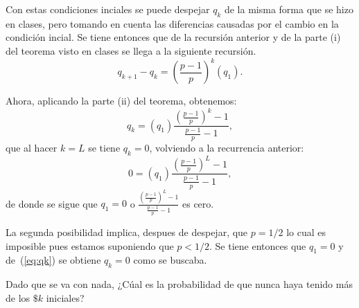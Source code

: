 \documentclass{scrartcl}
\begin{document}
Con estas condiciones inciales se puede despejar $q_k$ de la misma forma que
se hizo en clases, pero tomando en cuenta las diferencias causadas por el cambio
en la condición incial. Se tiene entonces que de la recursión anterior y de la parte (i)
del teorema visto en clases se llega a la siguiente recursión.
\[
	q_{k+1}-q_k = \left(\frac{p-1}{p}\right)^k(q_1).
\]

Ahora, aplicando la parte (ii) del teorema, obtenemos:
\begin{equation}\label{eq:qk}
	q_k = (q_1) \frac{
		\left(\frac{p-1}{p}\right)^k - 1
	}{
		\frac{p-1}{p} - 1
	},
\end{equation}
que al hacer $k=L$ se tiene $q_k=0$, volviendo a la recurrencia anterior:
\[
	0 = (q_1) \frac{
		\left(\frac{p-1}{p}\right)^L - 1
	}{
		\frac{p-1}{p} - 1
	},
\]
de donde se sigue que $q_1 = 0$ o  $\frac{
		\left(\frac{p-1}{p}\right)^L - 1
	}{
		\frac{p-1}{p} - 1
}$ es cero.

La segunda posibilidad implica, despues de despejar, que $p = 1/2$ lo cual es imposible
pues estamos suponiendo que $p<1/2$. Se tiene entonces que $q_1=0$ y de~(\ref{eq:qk})
se obtiene $q_k = 0$ como se buscaba.

\exercise
Dado que se va con nada, ¿Cúal es la probabilidad de que nunca haya
tenido más de los $\$ k$ iniciales?


\end{document}
